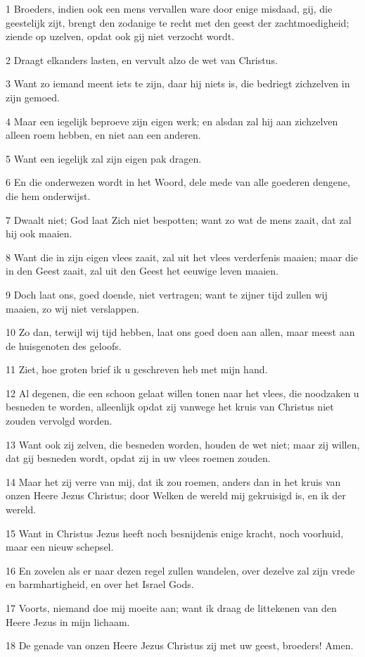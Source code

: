 \par 1 Broeders, indien ook een mens vervallen ware door enige misdaad, gij, die geestelijk zijt, brengt den zodanige te recht met den geest der zachtmoedigheid; ziende op uzelven, opdat ook gij niet verzocht wordt.
\par 2 Draagt elkanders lasten, en vervult alzo de wet van Christus.
\par 3 Want zo iemand meent iets te zijn, daar hij niets is, die bedriegt zichzelven in zijn gemoed.
\par 4 Maar een iegelijk beproeve zijn eigen werk; en alsdan zal hij aan zichzelven alleen roem hebben, en niet aan een anderen.
\par 5 Want een iegelijk zal zijn eigen pak dragen.
\par 6 En die onderwezen wordt in het Woord, dele mede van alle goederen dengene, die hem onderwijst.
\par 7 Dwaalt niet; God laat Zich niet bespotten; want zo wat de mens zaait, dat zal hij ook maaien.
\par 8 Want die in zijn eigen vlees zaait, zal uit het vlees verderfenis maaien; maar die in den Geest zaait, zal uit den Geest het eeuwige leven maaien.
\par 9 Doch laat ons, goed doende, niet vertragen; want te zijner tijd zullen wij maaien, zo wij niet verslappen.
\par 10 Zo dan, terwijl wij tijd hebben, laat ons goed doen aan allen, maar meest aan de huisgenoten des geloofs.
\par 11 Ziet, hoe groten brief ik u geschreven heb met mijn hand.
\par 12 Al degenen, die een schoon gelaat willen tonen naar het vlees, die noodzaken u besneden te worden, alleenlijk opdat zij vanwege het kruis van Christus niet zouden vervolgd worden.
\par 13 Want ook zij zelven, die besneden worden, houden de wet niet; maar zij willen, dat gij besneden wordt, opdat zij in uw vlees roemen zouden.
\par 14 Maar het zij verre van mij, dat ik zou roemen, anders dan in het kruis van onzen Heere Jezus Christus; door Welken de wereld mij gekruisigd is, en ik der wereld.
\par 15 Want in Christus Jezus heeft noch besnijdenis enige kracht, noch voorhuid, maar een nieuw schepsel.
\par 16 En zovelen als er naar dezen regel zullen wandelen, over dezelve zal zijn vrede en barmhartigheid, en over het Israel Gods.
\par 17 Voorts, niemand doe mij moeite aan; want ik draag de littekenen van den Heere Jezus in mijn lichaam.
\par 18 De genade van onzen Heere Jezus Christus zij met uw geest, broeders! Amen.



